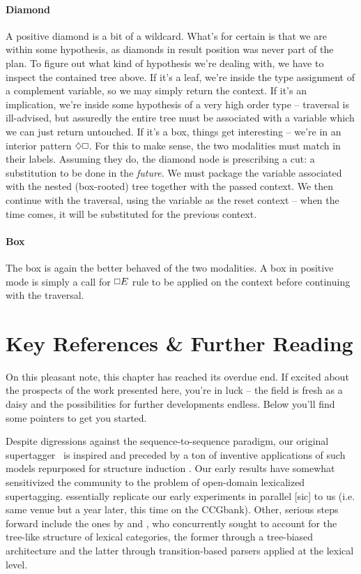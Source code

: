 \paragraph{Diamond}
A positive diamond is a bit of a wildcard.
What's for certain is that we are within some hypothesis, as diamonds in result position was never part of the plan.
To figure out what kind of hypothesis we're dealing with, we have to inspect the contained tree above.
If it's a leaf, we're inside the type assignment of a complement variable, so we may simply return the context.
If it's an implication, we're inside some hypothesis of a very high order type -- traversal is ill-advised, but assuredly the entire tree must be associated with a variable which we can just return untouched.
If it's a box, things get interesting -- we're in an interior pattern $\diamond\bx$.
For this to make sense, the two modalities must match in their labels.
Assuming they do, the diamond node is prescribing a cut: a substitution to be done in the \textit{future}.
We must package the variable associated with the nested (box-rooted) tree together with the passed context.
We then continue with the traversal, using the variable as the reset context -- when the time comes, it will be substituted for the previous context.

\paragraph{Box}
The box is again the better behaved of the two modalities.
A box in positive mode is simply a call for $\bx E$ rule to be applied on the context before continuing with the traversal.

\section{Key References \& Further Reading}
On this pleasant note, this chapter has reached its overdue end.
If excited about the prospects of the work presented here, you're in luck -- the field is fresh as a daisy and the possibilities for further developments endless.
Below you'll find some pointers to get you started.

Despite digressions against the sequence-to-sequence paradigm, our original supertagger~\cite{kogkalidis-etal-2019-constructive} is inspired and preceded by a ton of inventive applications of such models repurposed for structure induction \cite[inter alia]{vinyals2015grammar,wiseman2016sequence,dong-lapata-2016-language,buys2017robust}.
Our early results have somewhat sensitivized the community to the problem of open-domain lexicalized supertagging.
\citet{bhargava2020supertagging} essentially replicate our early experiments in parallel [sic] to us (i.e. same venue but a year later, this time on the CCGbank).
Other, serious steps forward include the ones by \citet{prange-etal-2021-supertagging} and \citet{Liu_Ji_Wu_Lan_2021}, who concurrently sought to account for the tree-like structure of lexical categories, the former through a tree-biased architecture and the latter through transition-based parsers applied at the lexical level.

